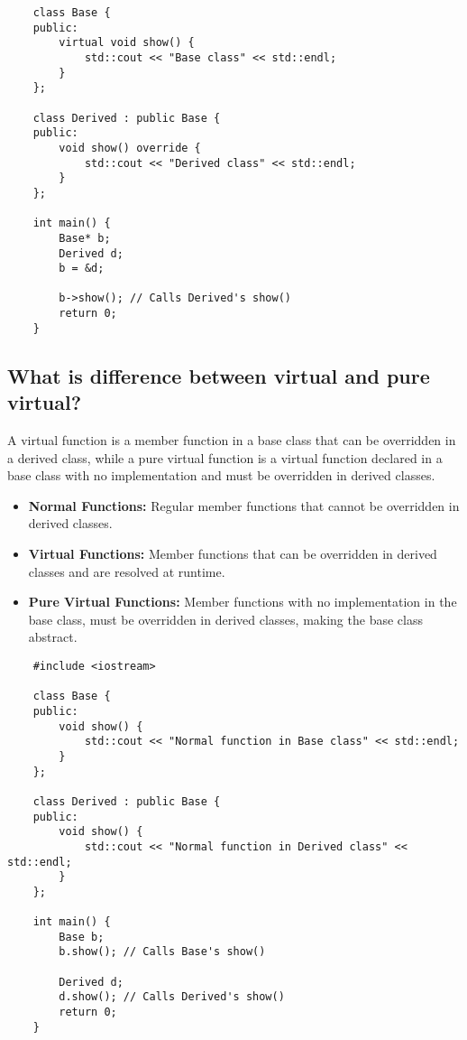 \begin{itemize}
\begin{tcolorbox}[title=Function Overriding]
\begin{verbatim}
    class Base {
    public:
        virtual void show() {
            std::cout << "Base class" << std::endl;
        }
    };

    class Derived : public Base {
    public:
        void show() override {
            std::cout << "Derived class" << std::endl;
        }
    };

    int main() {
        Base* b;
        Derived d;
        b = &d;

        b->show(); // Calls Derived's show()
        return 0;
    }
    \end{verbatim}
    \end{tcolorbox}
\end{itemize}

\subsection{What is difference between virtual and pure virtual?}
A virtual function is a member function in a base class that can be overridden in a derived class, while a pure virtual function is a virtual function declared in a base class with no implementation and must be overridden in derived classes.
\begin{itemize}
    \item \textbf{Normal Functions:} Regular member functions that cannot be overridden in derived classes.
    \item \textbf{Virtual Functions:} Member functions that can be overridden in derived classes and are resolved at runtime.
    \item \textbf{Pure Virtual Functions:} Member functions with no implementation in the base class, must be overridden in derived classes, making the base class abstract.
\end{itemize}
\begin{tcolorbox}[title=Normal Function]
\begin{verbatim}
    #include <iostream>

    class Base {
    public:
        void show() {
            std::cout << "Normal function in Base class" << std::endl;
        }
    };

    class Derived : public Base {
    public:
        void show() {
            std::cout << "Normal function in Derived class" << std::endl;
        }
    };

    int main() {
        Base b;
        b.show(); // Calls Base's show()

        Derived d;
        d.show(); // Calls Derived's show()
        return 0;
    }
\end{verbatim}
\end{tcolorbox}
